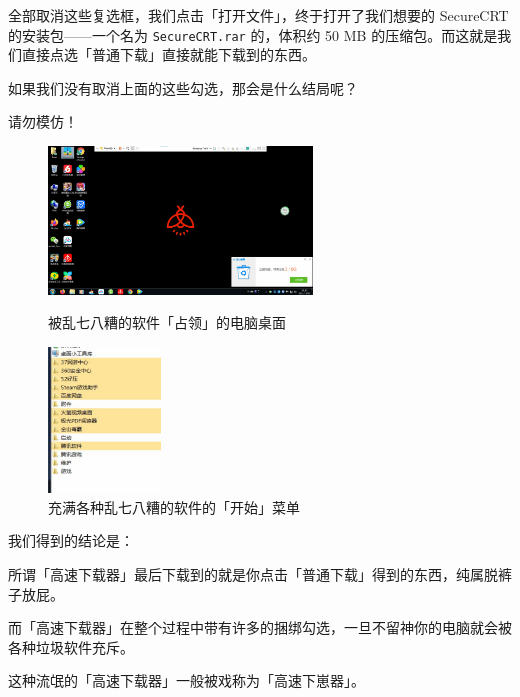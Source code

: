 全部取消这些复选框，我们点击「打开文件」，终于打开了我们想要的 SecureCRT 的安装包——一个名为 \verb|SecureCRT.rar| 的，体积约 50 MB 的压缩包。而这就是我们直接点选「普通下载」直接就能下载到的东西。

如果我们没有取消上面的这些勾选，那会是什么结局呢？

\begin{warning}
  请勿模仿！
\end{warning}

\begin{figure}[H]
  \centering
  \begin{minipage}{8cm}
    \centering
    \includegraphics[width=7cm]{assets/Gao_su_4.jpg}
    \caption{被乱七八糟的软件「占领」的电脑桌面}
    \label{gao-su-downloader-4}
  \end{minipage}
  \qquad
  \begin{minipage}{4cm}
    \centering
    \includegraphics[width=3cm]{assets/Gao_su_5.jpg}
    \caption{充满各种乱七八糟的软件的「开始」菜单}
    \label{gao-su-downloader-5}
  \end{minipage} 
\end{figure}

我们得到的结论是：

所谓「高速下载器」最后下载到的就是你点击「普通下载」得到的东西，纯属脱裤子放屁。

而「高速下载器」在整个过程中带有许多的捆绑勾选，一旦不留神你的电脑就会被各种垃圾软件充斥。

\begin{note}
  这种流氓的「高速下载器」一般被戏称为「高速下崽器」。
\end{note}

\practice

